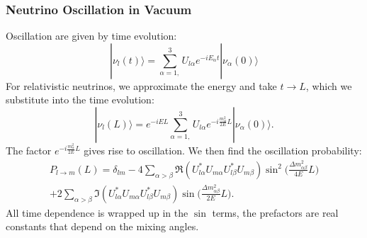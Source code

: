 \documentclass[10pt,professionalfonts,xcolor=table]{beamer}
\begin{document}
\frame
{
  \frametitle{Neutrino Oscillation in Vacuum}
  \begin{itemize}
	\bang Oscillation are given by time evolution:
	\begin{equation*}
		|\nu_l(t) \rangle = \sum_{\alpha = 1,}^3 U_{l\alpha}e^{-iE_\alpha t}|\nu_\alpha(0) \rangle
	\end{equation*}
	\bang For relativistic neutrinos, we approximate the energy and take $t \rightarrow L$, which we substitute into the time evolution:
	\begin{equation*}
		|\nu_l(L) \rangle = e^{-iEL} \sum_{\alpha = 1,}^3 U_{l\alpha}e^{-i\frac{m_\alpha^2}{2E} L}|\nu_\alpha(0) \rangle.
	\end{equation*}
	\bang The factor $e^{-i\frac{m_\alpha^2}{2E} L}$ gives rise to oscillation. 
	\bang We then find the oscillation probability:
	\begin{equation*}\begin{split}
P_{l\rightarrow m}(L) =  \delta_{lm} - 4  \sum_{\alpha > \beta}  \Re(U^*_{l\alpha}U_{m\alpha}U^*_{l\beta}U_{m\beta}) \sin^2 \bigg(\frac{\Delta m_{\alpha\beta}^2}{4E} L\bigg) \\
 + 2  \sum_{\alpha>\beta}  \Im(U^*_{l\alpha}U_{m\alpha}U^*_{l\beta}U_{m\beta}) \sin\bigg(\frac{\Delta m_{\alpha\beta}^2}{2E}L\bigg).
\end{split}\end{equation*}
	\bang All time dependence is wrapped up in the $\sin$ terms, the prefactors are real constants that depend on the mixing angles.  


  \end{itemize}
}
\end{document}
